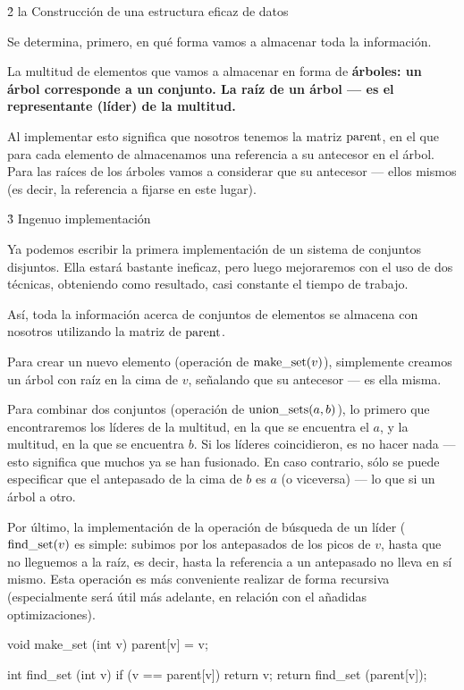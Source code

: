 \h2{ la Construcción de una estructura eficaz de datos }

Se determina, primero, en qué forma vamos a almacenar toda la información.

La multitud de elementos que vamos a almacenar en forma de \bf{árboles}: un árbol corresponde a un conjunto. La raíz de un árbol --- es el representante (líder) de la multitud.

Al implementar esto significa que nosotros tenemos la matriz ${\rm parent}$, en el que para cada elemento de almacenamos una referencia a su antecesor en el árbol. Para las raíces de los árboles vamos a considerar que su antecesor --- ellos mismos (es decir, la referencia a fijarse en este lugar).



\h3{ Ingenuo implementación }

Ya podemos escribir la primera implementación de un sistema de conjuntos disjuntos. Ella estará bastante ineficaz, pero luego mejoraremos con el uso de dos técnicas, obteniendo como resultado, casi constante el tiempo de trabajo.

Así, toda la información acerca de conjuntos de elementos se almacena con nosotros utilizando la matriz de ${\rm parent}$.

Para crear un nuevo elemento (operación de ${\rm make\_set}(v)$), simplemente creamos un árbol con raíz en la cima de $v$, señalando que su antecesor --- es ella misma.

Para combinar dos conjuntos (operación de ${\rm union\_sets}(a,b)$), lo primero que encontraremos los líderes de la multitud, en la que se encuentra el $a$, y la multitud, en la que se encuentra $b$. Si los líderes coincidieron, es no hacer nada --- esto significa que muchos ya se han fusionado. En caso contrario, sólo se puede especificar que el antepasado de la cima de $b$ es $a$ (o viceversa) --- lo que si un árbol a otro.

Por último, la implementación de la operación de búsqueda de un líder (${\rm find\_set}(v)$ es simple: subimos por los antepasados de los picos de $v$, hasta que no lleguemos a la raíz, es decir, hasta la referencia a un antepasado no lleva en sí mismo. Esta operación es más conveniente realizar de forma recursiva (especialmente será útil más adelante, en relación con el añadidas optimizaciones).

\code
void make_set (int v) {
parent[v] = v;
}

int find_set (int v) {
if (v == parent[v])
return v;
return find_set (parent[v]);
}

